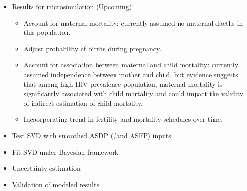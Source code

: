 \documentclass[11pt,letterpaper]{article}
\begin{document}
\begin{itemize}
\item Results for microsimulation (Upcoming)
  \begin{itemize}
    \item Account for maternal mortality: currently assumed no maternal daeths in this population.  
    \item Adjust probability of births during pregnancy. 
    \item Account for association between maternal and child mortality: currently assumed independence between mother and child, but evidence suggests that among high HIV-prevalence population, maternal mortality is significantly associated with child mortality and could impact the validity of indirect estimation of child mortality. \cite{quattrochi2019measuring}
    \item Incoorporating trend in fertility and mortality schedules over time.  
  \end{itemize}
\item Test SVD with smoothed ASDP (/and ASFP) inputs
\item Fit SVD under Bayesian framework
\item Uncertainty estimation
\item Validation of modeled results
\end{itemize}



    
\end{document}
